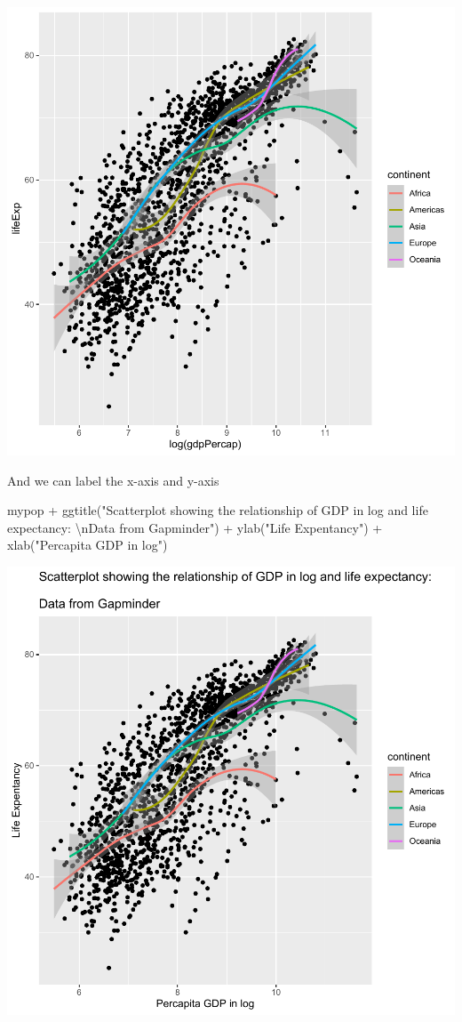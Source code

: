 \documentclass[
]{book}
\makeatletter
\newenvironment{Shaded}{\begin{snugshade}}{\end{snugshade}}
\newcommand{\FunctionTok}[1]{\textcolor[rgb]{0,0,0}{#1}}
\newcommand{\NormalTok}[1]{#1}
\newcommand{\SpecialCharTok}[1]{\textcolor[rgb]{0,0,0}{#1}}
\newcommand{\StringTok}[1]{\textcolor[rgb]{0.5,0.5,0.5}{#1}}
\newenvironment{kframe}{%
\medskip{}
\setlength{\fboxsep}{.8em}
 \def\at@end@of@kframe{}%
 \ifinner\ifhmode%
  \def\at@end@of@kframe{\end{minipage}}%
  \begin{minipage}{\columnwidth}%
 \fi\fi%
 \def\FrameCommand##1{\hskip\@totalleftmargin \hskip-\fboxsep
 \colorbox{shadecolor}{##1}\hskip-\fboxsep
     \hskip-\linewidth \hskip-\@totalleftmargin \hskip\columnwidth}%
 \MakeFramed {\advance\hsize-\width
   \@totalleftmargin\z@ \linewidth\hsize
   \@setminipage}}%
 {\par\unskip\endMakeFramed%
 \at@end@of@kframe}
\renewenvironment{Shaded}{\begin{kframe}}{\end{kframe}}
\makeatother
\begin{document}
\begin{center}\includegraphics[width=0.7\linewidth,keepaspectratio]{Multivariable_Data_Analysis_files/figure-latex/unnamed-chunk-39-1} \end{center}

And we can label the x-axis and y-axis

\begin{Shaded}
\begin{Highlighting}[]
\NormalTok{mypop }\SpecialCharTok{+} \FunctionTok{ggtitle}\NormalTok{(}\StringTok{"Scatterplot showing the relationship of GDP in log and life expectancy:}
\StringTok{                }\SpecialCharTok{\textbackslash{}n}\StringTok{Data from Gapminder"}\NormalTok{) }\SpecialCharTok{+} \FunctionTok{ylab}\NormalTok{(}\StringTok{"Life Expentancy"}\NormalTok{) }\SpecialCharTok{+} \FunctionTok{xlab}\NormalTok{(}\StringTok{"Percapita GDP in log"}\NormalTok{)}
\end{Highlighting}
\end{Shaded}

\begin{center}\includegraphics[width=0.7\linewidth,keepaspectratio]{Multivariable_Data_Analysis_files/figure-latex/unnamed-chunk-40-1} \end{center}
\end{document}
